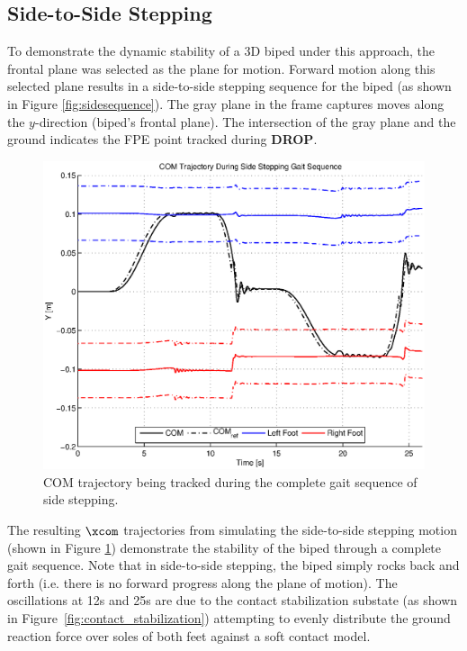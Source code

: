 \subsection{Side-to-Side Stepping} %
\label{sub:3d_simulations}

To demonstrate the dynamic stability of a 3D biped under this approach, the frontal plane was selected as the plane for motion. Forward motion along this selected plane results in a side-to-side stepping sequence for the biped (as shown in Figure \ref{fig:sidesequence}). The gray plane in the frame captures moves along the $y$-direction (biped's frontal plane). The intersection of the gray plane and the ground indicates the FPE point tracked during \textbf{DROP}. 

\begin{figure}[!b]
	\centering
    \includegraphics[scale=0.7]{fig/simulations/sidecomtraj.eps}
  	\caption{COM trajectory being tracked during the complete gait sequence of side stepping.}
	\label{fig:sidecomtraj}
\end{figure}

The resulting $\xcom$ trajectories from simulating the side-to-side stepping motion (shown in Figure \ref{fig:sidecomtraj}) demonstrate the stability of the biped through a complete gait sequence. Note that in side-to-side stepping, the biped simply rocks back and forth (i.e. there is no forward progress along the plane of motion). The oscillations at 12s and 25s are due to the contact stabilization substate (as shown in Figure~\ref{fig:contact_stabilization}) attempting to evenly distribute the ground reaction force over soles of both feet against a soft contact model. 

